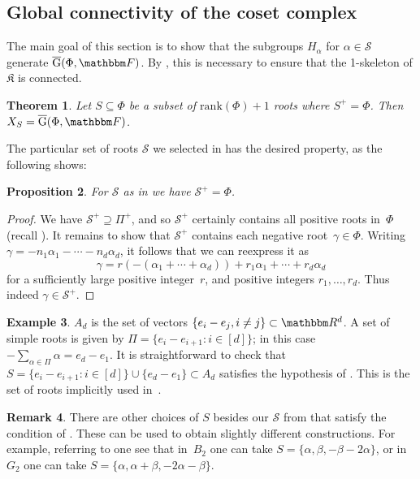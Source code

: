 \documentclass[10pt,a4paper]{article}
\newtheorem{theorem}{Theorem}[section]
\newtheorem{proposition}[theorem]{Proposition}
\theoremstyle{definition}
\newtheorem{remark}[theorem]{Remark}
\newtheorem{example}[theorem]{Example}
\newcommand{\R}{\mathbbm R}
\newcommand{\F}{\mathbbm F}
\newcommand{\ol}[1]{\overline{#1}}
\newcommand{\calS}{\mathcal{S}}
\newcommand{\Esc}[2]{\ol{\mathrm{G}}(#1,#2)}
\newcommand{\Gu}[2]{\ol{\mathrm{G}}(#1,#2)}
\newcommand{\rank}{{\mathrm{rank}}}
\newcommand{\complex}{\mathfrak{K}}
\begin{document}
\subsection{Global connectivity of the coset complex}

The main goal of this section is to show that the subgroups $H_\alpha$ for $\alpha \in \calS$ generate $\Esc{\Phi}{\F}$. By , this is necessary to ensure that the 1-skeleton of $\complex$ is connected.

\begin{theorem}\label{thm:rootgen}
    Let $S \subseteq \Phi$ be a subset of $\rank(\Phi)+1$ roots where $S^+ = \Phi$. Then $X_S = \Gu{\Phi}{\F}$.
\end{theorem}

The particular set of roots $\calS$ we selected in  has the desired property, as the following shows:
\begin{proposition}\label{prop:sspan}
    For $\calS$ as in \textnormal{} we have $\calS^+ = \Phi$.
\end{proposition}
\begin{proof}
    We  have $\calS^+ \supseteq \Pi^+$, and so $\calS^+$ certainly contains all positive roots in~$\Phi$ (recall ).
    It remains to show that $\calS^+$ contains each negative root~$\gamma \in \Phi$.
    Writing $\gamma = -n_1 \alpha_1 - \cdots -n_d \alpha_d$, it follows that we can reexpress it as
    \[
        \gamma = r (-(\alpha_1 + \cdots + \alpha_d)) + r_1 \alpha_1 + \cdots + r_d \alpha_d
    \]
    for a sufficiently large positive integer~$r$, and positive integers $r_1, \dots, r_d$.
    Thus indeed $\gamma \in \calS^+$.
\end{proof}
\begin{example}
    $A_d$ is the set of vectors $\{e_i -e_j, i \neq j\} \subset \R^d$. A set of simple roots is given by $ \Pi = \{e_i-e_{i+1} : i \in [d]\}$; in this case $-\sum_{\alpha \in \Pi} \alpha = e_d-e_1$. It is straightforward to check that $S = \{e_i-e_{i+1} : i \in [d]\}\cup \{e_d-e_1\} \subset A_d$ satisfies the hypothesis of . This is the set of roots implicitly used in~\cite{KO18}.
\end{example}
\begin{remark}  \label{rem:alt}
    There are other choices of $S$ besides our $\calS$ from  that satisfy the condition of .
    These can be used to obtain slightly different constructions.
    For example, referring to  one see that in~$B_2$ one can take $S = \{\alpha, \beta, -\beta-2\alpha\}$, or in~$G_2$ one can take $S = \{\alpha, \alpha+\beta, -2\alpha - \beta\}$.
\end{remark}
\end{document}
